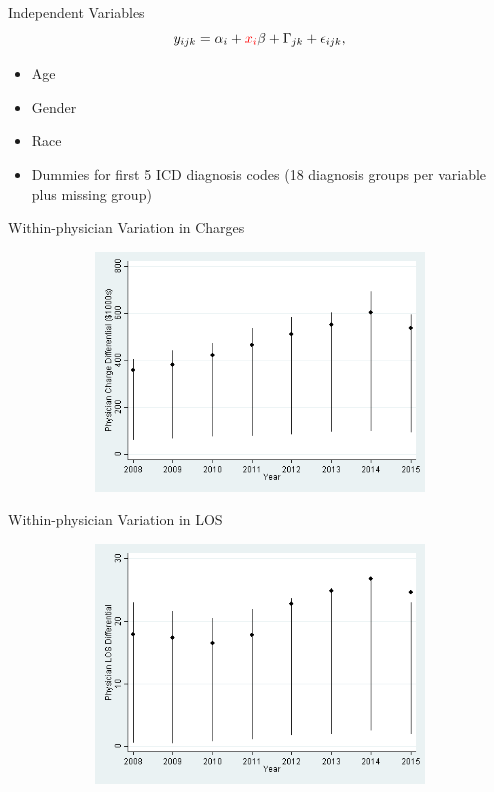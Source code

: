 \documentclass[t]{beamer}
\begin{document}
\begin{frame}{Independent Variables}
    \begin{equation*}
        y_{ijk} = \alpha_{i} + \textcolor{red}{x_{i}}\beta + \Gamma_{jk} + \epsilon_{ijk},
    \end{equation*}

    \begin{itemize}
        \item Age
        \item Gender
        \item Race
        \item Dummies for first 5 ICD diagnosis codes (18 diagnosis groups per variable plus missing group)
    \end{itemize}
\end{frame}


\begin{frame}{Within-physician Variation in Charges}
    \begin{figure}
        \centering
        \includegraphics[height=2.5in,width=5in,keepaspectratio]{PhySave_Graph}
    \end{figure}
\end{frame}

\begin{frame}{Within-physician Variation in LOS}
    \begin{figure}
        \centering
        \includegraphics[height=2.5in,width=5in,keepaspectratio]{PhyLOS_Graph} \\
    \end{figure}
\end{frame}
\end{document}
